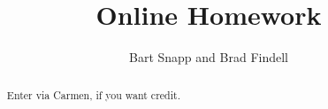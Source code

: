 \documentclass[handout,space,nooutcomes]{xourse}
\title{Online Homework}
\author{Bart Snapp and Brad Findell}
\begin{document}
\begin{abstract}
Enter via Carmen, if you want credit.  
\end{abstract}
\maketitle

{}
\end{document}
